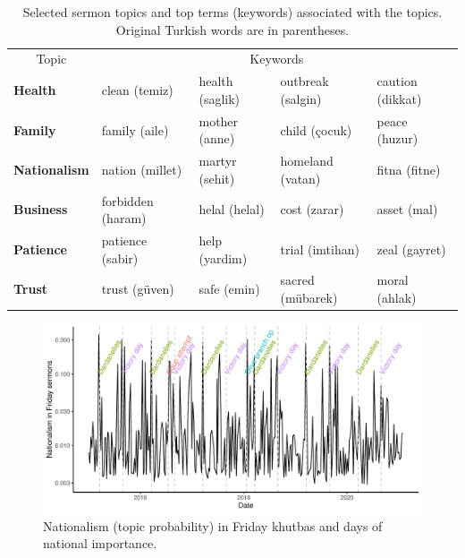 \documentclass[
  12pt,
]{article}
\begin{document}
\begin{table}

\caption{\label{tab:tab1}Selected sermon topics and top terms (keywords) associated with the topics. Original Turkish words are in parentheses.}
\centering
\begin{tabular}[t]{>{}lllll}
\toprule
\multicolumn{1}{c}{Topic} & \multicolumn{4}{c}{Keywords} \\
\cmidrule(l{3pt}r{3pt}){1-1} \cmidrule(l{3pt}r{3pt}){2-5}
\textbf{Health} & clean (temiz) & health (saglik) & outbreak (salgin) & caution (dikkat)\\
\textbf{Family} & family (aile) & mother (anne) & child (çocuk) & peace (huzur)\\
\textbf{Nationalism} & nation (millet) & martyr (sehit) & homeland (vatan) & fitna (fitne)\\
\textbf{Business} & forbidden (haram) & helal (helal) & cost (zarar) & asset (mal)\\
\textbf{Patience} & patience (sabir) & help (yardim) & trial (imtihan) & zeal (gayret)\\
\textbf{Trust} & trust (güven) & safe (emin) & sacred (mübarek) & moral (ahlak)\\
\bottomrule
\end{tabular}
\end{table}

\begin{figure}

{\centering \includegraphics{Khutbas_files/figure-latex/fig-3-1} 

}

\caption{Nationalism (topic probability) in Friday khutbas and days of national importance.}\label{fig:fig-3}
\end{figure}
\end{document}
